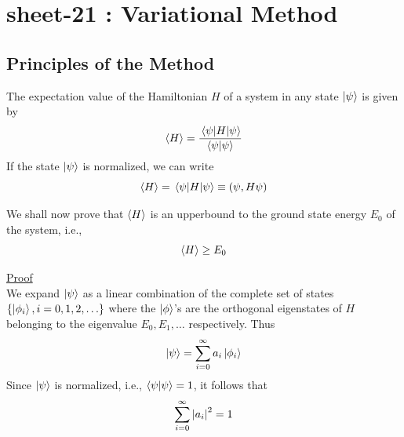
\chapter{sheet-21 : Variational Method}
\ifpdf
\graphicspath{{Chapter21/figs/}}
\else
\graphicspath{{Chapter21/figs/}}
\fi

\section{Principles of the Method}
The expectation value of the Hamiltonian $H$ of a system in any state $\ket{\psi}$ is given by
\begin{equation}
\expval{H} = \frac{\expval{H}{\psi}}{\braket{\psi}{\psi}}
\label{chapter21.eqn1-principle}
\end{equation}
If the state $\ket{\psi}$ is normalized, we can write
\begin{equation}
\expval{H} = \expval{H}{\psi} \equiv \qty(\psi, H \psi)
\label{chapter21.eqn2-principle}
\end{equation}

We shall now prove that $\expval{H}$ is an upperbound to the ground state energy $E_0$ of the system, i.e.,
\begin{equation}
\expval{H} \geq E_0
\label{chapter21.eqn3-principle}
\end{equation}

\underline{Proof}\\
	We expand $\ket{\psi}$ as a linear combination of the complete set of states $\{\ket{\phi_i}, i=0,1,2,\ldots\}$ where the $\ket{\phi}$'s are the orthogonal eigenstates of $H$ belonging to the eigenvalue $E_0, E_1, \ldots$ respectively. Thus
	\begin{equation}
		\ket{\psi} = \sum_{i=0}^{\infty} a_i \ket{\phi_i}
		\label{chapter21.eqn4-principle}
	\end{equation}
	Since $\ket{\psi}$ is normalized, i.e., $\braket{\psi}{\psi} = 1$, it follows that
	\begin{equation}
		\sum_{i=0}^{\infty} \abs{a_i}^2 = 1
		\label{chapter21.eqn5-principle}
	\end{equation}
	
